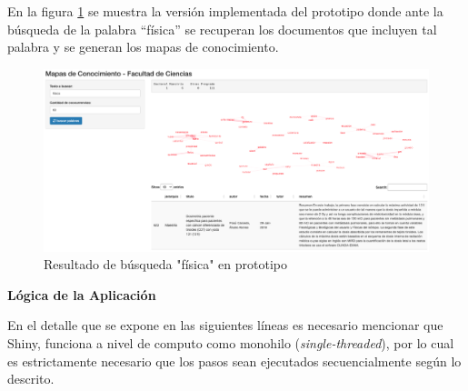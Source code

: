 \documentclass[
  12pt,
  openany]{book}
\begin{document}
En la figura \ref{fig:prototipoapp} se muestra la versión implementada del prototipo donde ante la búsqueda de la palabra ``física'' se recuperan los documentos que incluyen tal palabra y se generan los mapas de conocimiento.

\begin{figure}

{\centering \includegraphics[width=0.8\linewidth]{images/05-desarrollo/2_ciclo/UI/prototipo_app} 

}

\caption{Resultado de búsqueda "física" en prototipo}\label{fig:prototipoapp}
\end{figure}

\textbf{Lógica de la Aplicación}

En el detalle que se expone en las siguientes líneas es necesario mencionar que Shiny, funciona a nivel de computo como monohilo (\emph{single-threaded}), por lo cual es estrictamente necesario que los pasos sean ejecutados secuencialmente según lo descrito.
\end{document}
